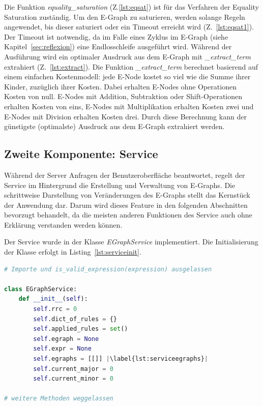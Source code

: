 Die Funktion \textit{equality\_saturation} (Z.\ref{lst:eqsat}) ist für das Verfahren der Equality Saturation zuständig. Um den E-Graph zu saturieren, werden solange Regeln angewendet, bis
dieser saturiert oder ein Timeout erreicht wird (Z.~\ref{lst:eqsat1}).
Der Timeout ist notwendig, da im Falle eines Zyklus im E-Graph (siehe Kapitel~\ref{sec:reflexion}) eine Endlosschleife ausgeführt wird.
Während der Ausführung wird ein optimaler Ausdruck aus dem E-Graph mit \textit{\_extract\_term} extrahiert (Z.~\ref{lst:extract}).
Die Funktion \textit{\_extract\_term} berechnet basierend auf einem einfachen Kostenmodell: jede E-Node kostet so viel wie die Summe ihrer Kinder, zuzüglich ihrer Kosten.
Dabei erhalten E-Nodes ohne Operationen Kosten von null. E-Nodes mit Addition, Subtraktion oder Shift-Operationen
erhalten Kosten von eins, E-Nodes mit Multiplikation erhalten Kosten zwei und E-Nodes mit Division erhalten Kosten drei.
Durch diese Berechnung kann der günstigste (optimalste) Ausdruck aus dem E-Graph extrahiert werden.

\subsection{Zweite Komponente: Service}

Während der Server Anfragen der Benutzeroberfläche beantwortet, regelt der Service im Hintergrund die Erstellung und Verwaltung von E-Graphs.
Die schrittweise Darstellung von Veränderungen des E-Graphs stellt das Kernstück der Anwendung dar. Darum wird dieses Feature in den folgenden Abschnitten bevorzugt behandelt,
da die meisten anderen Funktionen des Service auch ohne Erklärung verstanden werden können.

Der Service wurde in der Klasse \textit{EGraphService} implementiert. Die Initialisierung der Klasse erfolgt in Listing~\ref{lst:serviceinit}.

\begin{lstlisting}[language=Python, escapechar=|, caption=Auszug aus der Datei \textit{EGraphService.py}, label={lst:serviceinit}]
# Importe und is_valid_expression(expression) ausgelassen 

class EGraphService:
    def __init__(self):
        self.rrc = 0
        self.dict_of_rules = {}
        self.applied_rules = set()
        self.egraph = None
        self.expr = None
        self.egraphs = [[]] |\label{lst:serviceegraphs}|
        self.current_major = 0
        self.current_minor = 0

# weitere Methoden weggelassen
\end{lstlisting} 

